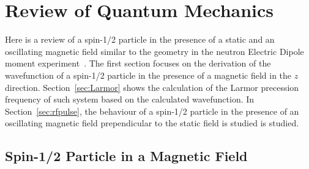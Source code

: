 \chapter{Review of Quantum Mechanics\label{chap:qm}}
Here is a review of a spin-1/2 particle in the presence of a static
and an oscillating magnetic field similar to the geometry in the
neutron Electric Dipole moment experiment~\cite{NMR_Notes}. The first
section focuses on the derivation of the wavefunction of a spin-1/2
particle in the presence of a magnetic field in the $z$
direction. Section~\ref{sec:Larmor} shows the calculation of the
Larmor precession frequency of such system based on the calculated
wavefunction. In Section~\ref{sec:rfpulse}, the behaviour of a
spin-1/2 particle in the presence of an oscillating magnetic field
prependicular to the static field is studied is studied. 

\section{Spin-1/2 Particle in a Magnetic Field}


